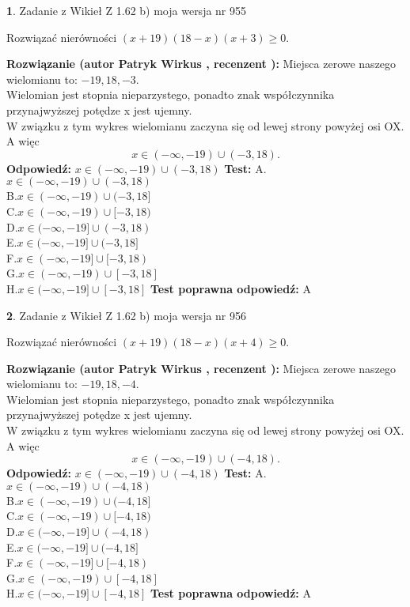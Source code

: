\documentclass[12pt, a4paper]{article}
\theoremstyle{definition} %
\newtheorem{zad}{}
\newcommand{\zadStart}[1]{\begin{zad}#1\newline}
\newcommand{\zadStop}{\end{zad}}
\newcommand{\rozwStart}[2]{\noindent \textbf{Rozwiązanie (autor #1 , recenzent #2): }\newline}
\newcommand{\rozwStop}{\newline}
\newcommand{\odpStart}{\noindent \textbf{Odpowiedź:}\newline}
\newcommand{\odpStop}{\newline}
\newcommand{\testStart}{\noindent \textbf{Test:}\newline}
\newcommand{\testStop}{\newline}
\newcommand{\kluczStart}{\noindent \textbf{Test poprawna odpowiedź:}\newline}
\newcommand{\kluczStop}{\newline}
\begin{document}
\zadStart{Zadanie z Wikieł Z 1.62 b) moja wersja nr 955}

Rozwiązać nierówności $(x+19)(18-x)(x+3)\ge0$.
\zadStop
\rozwStart{Patryk Wirkus}{}
Miejsca zerowe naszego wielomianu to: $-19, 18, -3$.\\
Wielomian jest stopnia nieparzystego, ponadto znak współczynnika przy\linebreak najwyższej potędze x jest ujemny.\\ W związku z tym wykres wielomianu zaczyna się od lewej strony powyżej osi OX. A więc $$x \in (-\infty,-19) \cup (-3,18).$$
\rozwStop
\odpStart
$x \in (-\infty,-19) \cup (-3,18)$
\odpStop
\testStart
A.$x \in (-\infty,-19) \cup (-3,18)$\\
B.$x \in (-\infty,-19) \cup (-3,18]$\\
C.$x \in (-\infty,-19) \cup [-3,18)$\\
D.$x \in (-\infty,-19] \cup (-3,18)$\\
E.$x \in (-\infty,-19] \cup (-3,18]$\\
F.$x \in (-\infty,-19] \cup [-3,18)$\\
G.$x \in (-\infty,-19) \cup [-3,18]$\\
H.$x \in (-\infty,-19] \cup [-3,18]$
\testStop
\kluczStart
A
\kluczStop



\zadStart{Zadanie z Wikieł Z 1.62 b) moja wersja nr 956}

Rozwiązać nierówności $(x+19)(18-x)(x+4)\ge0$.
\zadStop
\rozwStart{Patryk Wirkus}{}
Miejsca zerowe naszego wielomianu to: $-19, 18, -4$.\\
Wielomian jest stopnia nieparzystego, ponadto znak współczynnika przy\linebreak najwyższej potędze x jest ujemny.\\ W związku z tym wykres wielomianu zaczyna się od lewej strony powyżej osi OX. A więc $$x \in (-\infty,-19) \cup (-4,18).$$
\rozwStop
\odpStart
$x \in (-\infty,-19) \cup (-4,18)$
\odpStop
\testStart
A.$x \in (-\infty,-19) \cup (-4,18)$\\
B.$x \in (-\infty,-19) \cup (-4,18]$\\
C.$x \in (-\infty,-19) \cup [-4,18)$\\
D.$x \in (-\infty,-19] \cup (-4,18)$\\
E.$x \in (-\infty,-19] \cup (-4,18]$\\
F.$x \in (-\infty,-19] \cup [-4,18)$\\
G.$x \in (-\infty,-19) \cup [-4,18]$\\
H.$x \in (-\infty,-19] \cup [-4,18]$
\testStop
\kluczStart
A
\kluczStop
\end{document}
